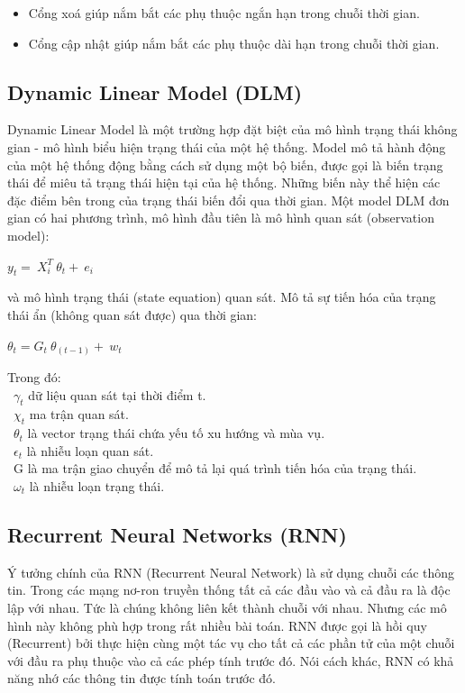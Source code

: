 \documentclass[conference]{IEEEtran}
\begin{document}
\begin{itemize}
    \item Cổng xoá giúp nắm bắt các phụ thuộc ngắn hạn trong chuỗi thời gian.
    \item Cổng cập nhật giúp nắm bắt các phụ thuộc dài hạn trong chuỗi thời gian.
\end{itemize}

\subsection{Dynamic Linear Model (DLM)}
Dynamic Linear Model là một trường hợp đặt biệt của mô hình trạng thái không gian - mô hình biểu hiện trạng thái của một hệ thống. Model mô tả hành động của một hệ thống động bằng cách sử dụng một bộ biến, được gọi là biến trạng thái để miêu tả trạng thái hiện tại của hệ thống. Những biến này thể hiện các đặc điểm bên trong của trạng thái biến đổi qua thời gian.
Một model DLM đơn gian có hai phương trình, mô hình đầu tiên là mô hình quan sát (observation model):
\begin{center}

    \(y_t=\ X_i^T\ \theta_t+\ e_i\)

\end{center}

và mô hình trạng thái (state equation) quan sát. Mô tả sự tiến hóa của trạng thái ẩn (không quan sát được) qua thời gian:

\begin{center}

    \(\theta_t=G_t\ \theta_(t-1)+\ w_t\)

\end{center}

Trong đó:\\
\indent\textbullet\ \(\gamma_t\) dữ liệu quan sát tại thời điểm t.\\
\indent\textbullet\ \(\chi_t\) ma trận quan sát.\\
\indent\textbullet\ \(\theta_t\) là vector trạng thái chứa yếu tố xu hướng và mùa vụ.\\
\indent\textbullet\ \(\epsilon_t\) là nhiễu loạn quan sát.\\
\indent\textbullet\ G là ma trận giao chuyển để mô tả lại quá trình tiến hóa của trạng thái.\\
\indent\textbullet\ \(\omega_t\) là nhiễu loạn trạng thái.

\subsection{Recurrent Neural Networks (RNN)}
Ý tưởng chính của RNN (Recurrent Neural Network) là sử dụng chuỗi các thông tin. Trong các mạng nơ-ron truyền thống tất cả các đầu vào và cả đầu ra là độc lập với nhau. Tức là chúng không liên kết thành chuỗi với nhau. Nhưng các mô hình này không phù hợp trong rất nhiều bài toán. RNN được gọi là hồi quy (Recurrent) bởi thực hiện cùng một tác vụ cho tất cả các phần tử của một chuỗi với đầu ra phụ thuộc vào cả các phép tính trước đó. Nói cách khác, RNN có khả năng nhớ các thông tin được tính toán trước đó.
\end{document}
